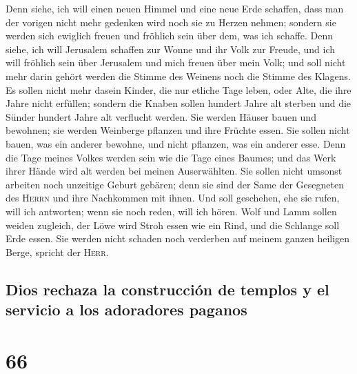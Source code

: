  Denn siehe, ich will einen neuen Himmel und eine neue
Erde schaffen, dass man der vorigen nicht mehr gedenken wird noch sie zu
Herzen nehmen;  sondern sie werden sich ewiglich freuen
und fröhlich sein über dem, was ich schaffe. Denn siehe, ich will
Jerusalem schaffen zur Wonne und ihr Volk zur Freude, 
und ich will fröhlich sein über Jerusalem und mich freuen über mein
Volk; und soll nicht mehr darin gehört werden die Stimme des Weinens
noch die Stimme des Klagens.  Es sollen nicht mehr dasein
Kinder, die nur etliche Tage leben, oder Alte, die ihre Jahre nicht
erfüllen; sondern die Knaben sollen hundert Jahre alt sterben und die
Sünder hundert Jahre alt verflucht werden.  Sie werden
Häuser bauen und bewohnen; sie werden Weinberge pflanzen und ihre
Früchte essen.  Sie sollen nicht bauen, was ein anderer
bewohne, und nicht pflanzen, was ein anderer esse. Denn die Tage meines
Volkes werden sein wie die Tage eines Baumes; und das Werk ihrer Hände
wird alt werden bei meinen Auserwählten.  Sie sollen
nicht umsonst arbeiten noch unzeitige Geburt gebären; denn sie sind der
Same der Gesegneten des \textsc{Herrn} und ihre Nachkommen mit ihnen.
 Und soll geschehen, ehe sie rufen, will ich antworten;
wenn sie noch reden, will ich hören.  Wolf und Lamm
sollen weiden zugleich, der Löwe wird Stroh essen wie ein Rind, und die
Schlange soll Erde essen. Sie werden nicht schaden noch verderben auf
meinem ganzen heiligen Berge, spricht der \textsc{Herr}.

\hypertarget{dios-rechaza-la-construcciuxf3n-de-templos-y-el-servicio-a-los-adoradores-paganos}{%
\subsection{Dios rechaza la construcción de templos y el servicio a los
adoradores
paganos}\label{dios-rechaza-la-construcciuxf3n-de-templos-y-el-servicio-a-los-adoradores-paganos}}

\hypertarget{section-65}{%
\section{66}\label{section-65}}

